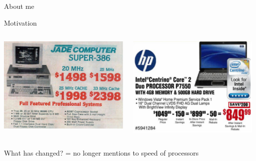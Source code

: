 \documentclass[10pt]{beamer}
\begin{document}
{\begin{frame}{About me}

\end{frame}
}


\begin{frame}{Motivation}
\begin{columns}[T] %
\begin{column}{.5\textwidth}
\includegraphics[width=1.05\linewidth]{img/old_ad}
\end{column}%
\hfill%
\begin{column}{.5\textwidth}
\includegraphics[width=\linewidth]{img/2006_ad}
\end{column}%
\end{columns}
What has changed?
 = no longer mentions to speed of processors
\end{frame}
\end{document}
